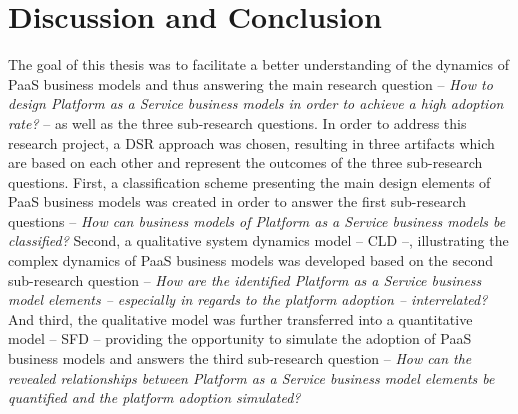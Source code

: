 \chapter{Discussion and Conclusion}\label{ch:dc}





The goal of this thesis was to facilitate a better understanding of the dynamics of \acf{PaaS} business models and thus answering the main research question -- \textit{How to design Platform as a Service business models in order to achieve a high adoption rate?} -- as well as the three sub-research questions. In order to address this research project, a \acf{DSR} approach was chosen, resulting in three artifacts which are based on each other and represent the outcomes of the three sub-research questions. First, a classification scheme presenting the main design elements of \ac{PaaS} business models was created in order to answer the first sub-research questions -- \textit{How can business models of Platform as a Service business models be classified?} Second, a qualitative system dynamics model -- \acf{CLD} --, illustrating the complex dynamics of \ac{PaaS} business models was developed based on the second sub-research question -- \textit{How are the identified Platform as a Service business model elements -- especially in regards to the platform adoption -- interrelated?} And third, the qualitative model was further transferred into a quantitative model -- \acf{SFD} -- providing the opportunity to simulate the adoption of \ac{PaaS} business models and answers the third sub-research question -- \textit{How can the revealed relationships between Platform as a Service business model elements be quantified and the platform adoption simulated?}

